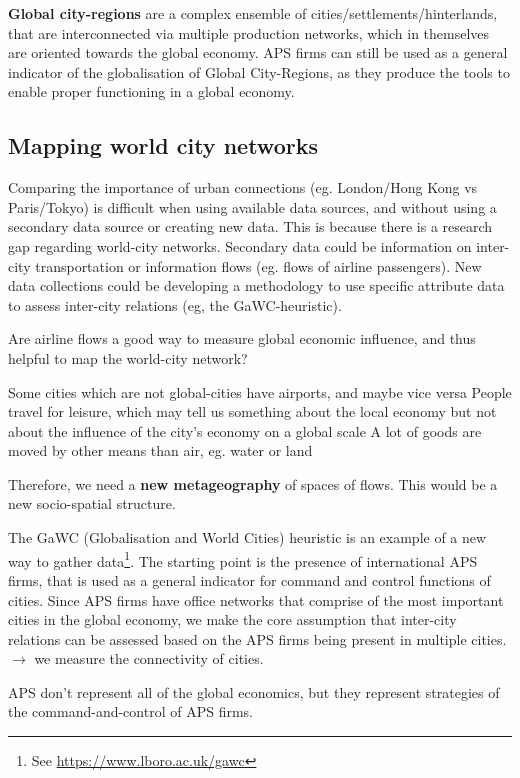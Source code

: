 \documentclass{article}
\begin{document}
\textbf{Global city-regions} are a complex ensemble of cities/settlements/hinterlands, that are interconnected via multiple production networks, which in themselves are oriented towards the global economy. APS firms can still be used as a general indicator of the globalisation of Global City-Regions, as they produce the tools to enable proper functioning in a global economy.

\subsection{Mapping world city networks}

Comparing the importance of urban connections (eg. London/Hong Kong vs Paris/Tokyo) is difficult when using available data sources, and without using a secondary data source or creating new data.
This is because there is a research gap regarding world-city networks.
Secondary data could be information on inter-city transportation or information flows (eg. flows of airline passengers). New data collections could be developing a methodology to use specific attribute data to assess inter-city relations (eg, the GaWC-heuristic).

Are airline flows a good way to measure global economic influence, and thus helpful to map the world-city network?
\begin{outline}
	\1 Some cities which are not global-cities have airports, and maybe vice versa
	\1 People travel for leisure, which may tell us something about the local economy but not about the influence of the city's economy on a global scale
	\1 A lot of goods are moved by other means than air, eg. water or land
\end{outline}

Therefore, we need a \textbf{new metageography} of spaces of flows. This would be a new socio-spatial structure.

The GaWC (Globalisation and World Cities) heuristic is an example of a new way to gather data\footnote{See \url{https://www.lboro.ac.uk/gawc}}. The starting point is the presence of international APS firms, that is used as a general indicator for command and control functions of cities. Since APS firms have office networks that comprise of the most important cities in the global economy, we make the core assumption that inter-city relations can be assessed based on the APS firms being present in multiple cities. $\rightarrow$ we measure the connectivity of cities.

APS don't represent all of the global economics, but they represent strategies of the command-and-control of APS firms. 
\end{document}
